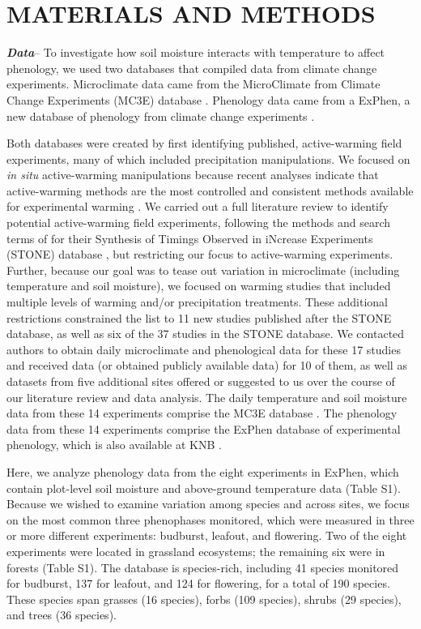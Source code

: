 \documentclass{article}
\begin{document}
\section* {MATERIALS AND METHODS}
\textbf {\emph{Data}}-- To investigate how soil moisture interacts with temperature to affect phenology, we used two databases that compiled data from climate change experiments. Microclimate data came from the MicroClimate from Climate Change Experiments (MC3E) database \citep{ettinger2018, ettinger2019}. Phenology data came from a ExPhen, a new database of phenology from climate change experiments \citep{ettinger2022}. 
\par Both databases were created by first identifying published, active-warming field experiments, many of which included precipitation manipulations. We focused on \textit{in situ} active-warming manipulations because recent analyses indicate that active-warming methods are the most controlled and consistent methods available for experimental warming \citep{kimball2005,kimball2008,aronson2009,wolkovich2012}. We carried out a full literature review to identify potential active-warming field experiments, following the methods and search terms of \citet{wolkovich2012} for their Synthesis of Timings Observed in iNcrease Experiments (STONE) database \citep{wolkovich2012}, but restricting our focus to active-warming experiments. Further, because our goal was to tease out variation in microclimate (including temperature and soil moisture), we focused on warming studies that included multiple levels of warming and/or precipitation treatments. These additional restrictions constrained the list to 11 new studies published after the STONE database, as well as six of the 37 studies in the STONE database. We contacted authors to obtain daily microclimate and phenological data for these 17 studies and received data (or obtained publicly available data) for 10 of them, as well as datasets from five additional sites offered or suggested to us over the course of our literature review and data analysis. The daily temperature and soil moisture data from these 14 experiments comprise the MC3E database \citep{ettinger2018,ettinger2019}. The phenology data from these 14 experiments comprise the ExPhen database of experimental phenology, which is also available at KNB \citep{ettinger2022}. 
\par Here, we analyze phenology data from the eight experiments in ExPhen, which contain plot-level soil moisture and above-ground temperature data (Table S1). Because we wished to examine variation among species and across sites, we focus on the most common three phenophases monitored, which were measured in three or more different experiments: budburst, leafout, and flowering. Two of the eight experiments were located in grassland ecosystems; the remaining six were in forests (Table S1). The database is species-rich, including 41 species monitored for budburst, 137 for leafout, and 124 for flowering, for a total of 190 species. These species span grasses (16 species), forbs (109 species), shrubs (29 species), and trees (36 species). %
\end{document}
